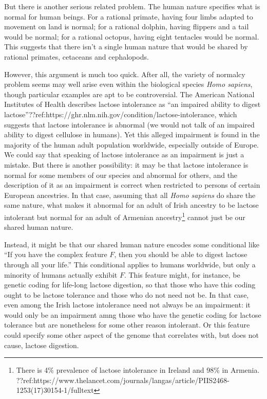 But there is another serious related problem. The human nature specifies what is normal for human beings. For a rational
primate, having four limbs adapted to movement on land is normal; for a rational dolphin, having flippers and a tail would be 
normal; for a rational octopus, having eight tentacles would be normal. This suggests that there isn't a single human nature
that would be shared by rational primates, cetaceans and cephalopods. 

However, this argument is much too quick. After all, the variety of normalcy problem seems may well arise even within the 
biological species \textit{Homo sapiens}, though particular examples are apt to be controversial. The American National
Institutes of Health describes lactose intolerance as ``an impaired ability to digest lactose''??ref:https://ghr.nlm.nih.gov/condition/lactose-intolerance,
which suggests that lactose intolerance is abnormal (we would not talk of an impaired ability to digest cellulose in humans).
Yet this alleged impairment is found in the majority of the human adult population worldwide, especially outside of Europe.
We could say that speaking of lactose intolerance as an impairment is just a mistake. But there is another possibility: it may
be that lactose intolerance is normal for some members of our species and abnormal for others, and the description of it as
an impairment is correct when restricted to persons of certain European ancestries.
In that case, assuming that all \textit{Homo sapiens} do share the same nature, what makes it abnormal for an adult
of Irish ancestry to be lactose intolerant but normal for an adult of Armenian ancestry\footnote{There is 4\% prevalence of
lactose intolerance in Ireland and 98\% in Armenia. ??ref:https://www.thelancet.com/journals/langas/article/PIIS2468-1253(17)30154-1/fulltext }
cannot just be our shared human nature. 

Instead, it might be that our shared human nature encodes some conditional like ``If you have the complex feature $F$, then you
should be able to digest lactose through all your life.'' This conditional applies to humans worldwide, but only a minority of humans
actually exhibit $F$. This feature might, for instance, be genetic coding for life-long lactose digestion, so that those
who have this coding ought to be lactose tolerance and those who do not need not be. In that case, even among the Irish lactose intolerance
need not always be an impairment: it would only be an impairment amng those who have the genetic coding for lactose tolerance but are
nonetheless for some other reason intolerant. Or this feature could specify some other aspect of the genome that correlates with, but
does not cause, lactose digestion.

